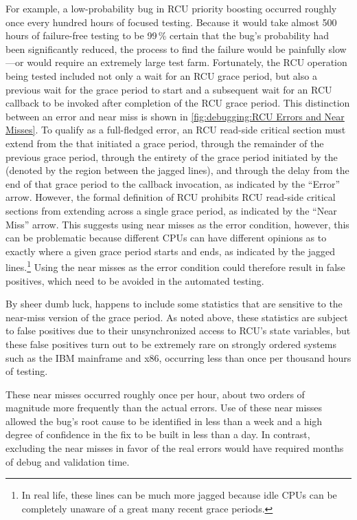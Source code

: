 For example, a low-probability bug in RCU priority boosting occurred
roughly once every hundred hours of focused  testing.
Because it would take almost 500 hours of failure-free testing to be
99\,\% certain that the bug's probability had been significantly reduced,
the  process
to find the failure would be painfully slow---or would require an extremely
large test farm.
Fortunately, the RCU operation being tested included not only a wait for
an RCU grace period, but also a previous wait for the grace period to start
and a subsequent wait for an RCU callback to be
invoked after completion of the RCU grace period.
This distinction between an  error and near miss is
shown in
\cref{fig:debugging:RCU Errors and Near Misses}.
To qualify as a full-fledged error, an RCU read-side critical section
must extend from the  that initiated a grace period,
through the remainder of the previous grace period, through the
entirety of the grace period initiated by the 
(denoted by the region between the jagged lines), and
through the delay from the end of that grace period to the callback
invocation, as indicated by the ``Error'' arrow.
However, the formal definition of RCU prohibits RCU read-side critical
sections from extending across a single grace period, as indicated by
the ``Near Miss'' arrow.
This suggests using near misses as the error condition, however, this
can be problematic because different CPUs can have different opinions
as to exactly where a given
grace period starts and ends, as indicated by the jagged lines.\footnote{
	In real life, these lines can be much more jagged because idle
	CPUs can be completely unaware of a great many recent grace
	periods.}
Using the near misses as the error condition could therefore result
in false positives, which need to be avoided in the automated
 testing.

By sheer dumb luck,  happens to include some statistics that
are sensitive to the near-miss version of the grace period.
As noted above, these statistics are subject to false positives due to
their unsynchronized access to RCU's state variables,
but these false positives turn out to be extremely rare on strongly
ordered systems such as the IBM mainframe and x86, occurring less than
once per thousand hours of testing.

These near misses occurred roughly once per hour, about two orders of
magnitude more frequently than the actual errors.
Use of these near misses allowed the bug's root cause to be identified
in less than a week and a high degree of confidence in the fix to be
built in less than a day.
In contrast, excluding the near misses in favor of the real errors would
have required months of debug and validation time.

